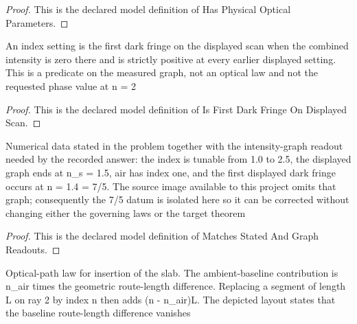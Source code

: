 \begin{proof}
  This is the declared model definition of Has Physical Optical Parameters.
\end{proof}
\begin{definition}
  \label{def:physics:phyx-mini-0089:phyxminiproblems-problemphyxmini0089-isfirstdarkfringeondisplayedscan}
  An index setting is the first dark fringe on the displayed scan when the combined intensity is zero there and is strictly positive at every earlier displayed setting. This is a predicate on the measured graph, not an optical law and not the requested phase value at n = 2
\end{definition}
\begin{proof}
  This is the declared model definition of Is First Dark Fringe On Displayed Scan.
\end{proof}
\begin{definition}
  \label{def:physics:phyx-mini-0089:phyxminiproblems-problemphyxmini0089-matchesstatedandgraphreadouts}
  Numerical data stated in the problem together with the intensity-graph readout needed by the recorded answer: the index is tunable from 1.0 to 2.5, the displayed graph ends at n\_s = 1.5, air has index one, and the first displayed dark fringe occurs at n = 1.4 = 7/5. The source image available to this project omits that graph; consequently the 7/5 datum is isolated here so it can be corrected without changing either the governing laws or the target theorem
\end{definition}
\begin{proof}
  This is the declared model definition of Matches Stated And Graph Readouts.
\end{proof}
\begin{definition}
  \label{def:physics:phyx-mini-0089:phyxminiproblems-problemphyxmini0089-satisfiesopticalpathdifferencelaw}
  Optical-path law for insertion of the slab. The ambient-baseline contribution is n\_air times the geometric route-length difference. Replacing a segment of length L on ray 2 by index n then adds (n - n\_air)L. The depicted layout states that the baseline route-length difference vanishes
\end{definition}
